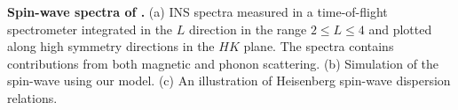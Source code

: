 \label{fig:fig1} {\bf Spin-wave spectra of \CROns.} (a) INS spectra measured in a time-of-flight spectrometer integrated in the $L$ direction in the range $2\leq L \leq4$ and plotted along high symmetry directions in the $HK$ plane. The spectra contains contributions from both magnetic and phonon scattering. (b) Simulation of the spin-wave using our model. (c) An illustration of Heisenberg spin-wave dispersion relations. 